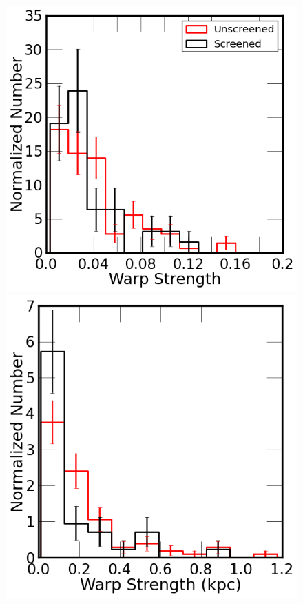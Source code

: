 \documentclass[useAMS,usenatbib,twocolumn]{mn2e}
\begin{document}
\begin{figure}
\begin{center}
 
\includegraphics[scale=0.45]{figures/warp-hist-sc-unsc.png}
\includegraphics[scale=0.44]{figures/warp-kpc-hist-sc-unsc.png}

\end{center}
\end{figure}
\end{document}
